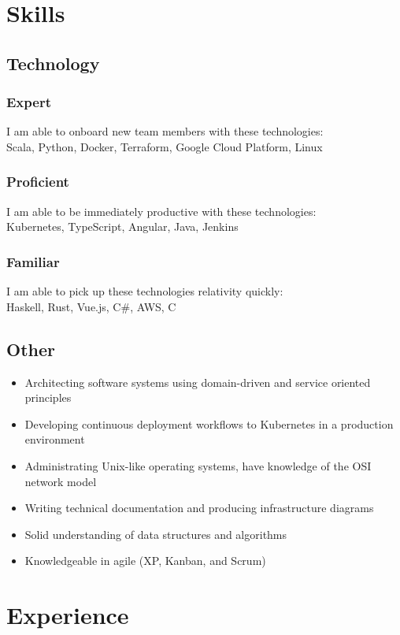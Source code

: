 \documentclass[letterpaper,12pt,oneside]{article}
\begin{document}
\section*{Skills}
\subsection*{Technology}
\subsubsection*{Expert}
I am able to onboard new team members with these technologies:\\
Scala, Python, Docker, Terraform, Google Cloud Platform, Linux
\subsubsection*{Proficient}
I am able to be immediately productive with these technologies:\\
Kubernetes, TypeScript, Angular, Java, Jenkins
\subsubsection*{Familiar}
I am able to pick up these technologies relativity quickly:\\
Haskell, Rust, Vue.js, C\#, AWS, C
\subsection*{Other}
\begin{itemize}
      \setlength\itemsep{0em}
      \item Architecting software systems using domain-driven and service oriented principles
      \item Developing continuous deployment workflows to Kubernetes in a production environment
      \item Administrating Unix-like operating systems, have knowledge of the OSI network model
      \item Writing technical documentation and producing infrastructure diagrams
      \item Solid understanding of data structures and algorithms
      \item Knowledgeable in agile (XP, Kanban, and Scrum)
\end{itemize}

\section*{Experience}
\end{document}
